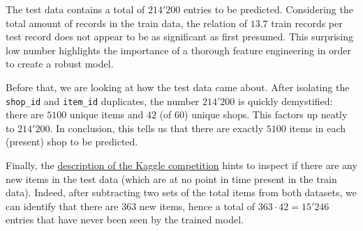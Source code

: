 The test data contains a total of $214'200$ entries to be predicted. Considering the total amount of records in the train data, the relation of $13.7$ train records per test record does not appear to be as significant as first presumed.
This surprising low number highlights the importance of a thorough feature engineering in order to create a robust model.

Before that, we are looking at how the test data came about. After isolating the \texttt{shop\_id} and \texttt{item\_id} duplicates, the number $214'200$ is quickly demystified: there are $5100$ unique items and $42$ (of $60$) unique shops. 
This factors up neatly to $214'200$.
In conclusion, this tells us that there are exactly $5100$ items in each (present) shop to be predicted.

Finally, the \href{https://www.kaggle.com/c/competitive-data-science-predict-future-sales/data}{description of the Kaggle competition} hints to inspect if there are any new items in the test data (which are at no point in time present in the train data). 
Indeed, after subtracting two sets of the total items from both datasets, we can identify that there are $363$ new items, hence a total of $363 \cdot 42=15'246$ entries that have never been seen by the trained model.
